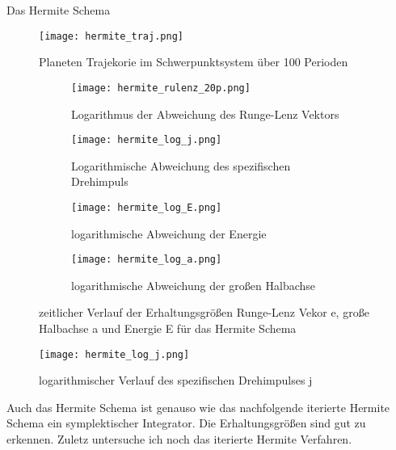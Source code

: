\documentclass[12pt]{article}
\begin{document}
Das Hermite Schema
\begin{figure}[H]\centering\texttt{[image: hermite\_traj.png]}\caption{Planeten Trajekorie im Schwerpunktsystem über 100 Perioden}\end{figure} 
\begin{figure}[H]
    \hspace*{-1.5cm}
    \begin{subfigure}{0.4\textwidth}
    \texttt{[image: hermite\_rulenz\_20p.png]}
    \caption{Logarithmus der Abweichung des Runge-Lenz Vektors}
    \end{subfigure}
    \hfill
    \begin{subfigure}{0.4\textwidth}
    \hspace*{-0.8cm}
    \texttt{[image: hermite\_log\_j.png]}
    \caption{Logarithmische Abweichung des spezifischen Drehimpuls}
    \end{subfigure}
    \hfill
    \hspace*{-1.5cm}
    \begin{subfigure}{0.4\textwidth}
    \texttt{[image: hermite\_log\_E.png]}
    \caption{logarithmische Abweichung der Energie}
    \end{subfigure}
    \hfill
    \begin{subfigure}{0.4\textwidth}
    \hspace*{-0.8cm}
    \texttt{[image: hermite\_log\_a.png]}
    \caption{logarithmische Abweichung der großen Halbachse}
    \end{subfigure}
    \hfill
    \caption{zeitlicher Verlauf der Erhaltungsgrößen Runge-Lenz Vekor e, große Halbachse a und Energie E für das Hermite Schema}\end{figure}
    \begin{figure}[H]\centering\texttt{[image: hermite\_log\_j.png]}\caption{logarithmischer Verlauf des spezifischen Drehimpulses j}\end{figure}
    Auch das Hermite Schema ist genauso wie das nachfolgende iterierte Hermite Schema ein symplektischer Integrator. Die Erhaltungsgrößen sind gut zu erkennen.\newline\newline
    Zuletz untersuche ich noch das iterierte Hermite Verfahren.
\end{document}
